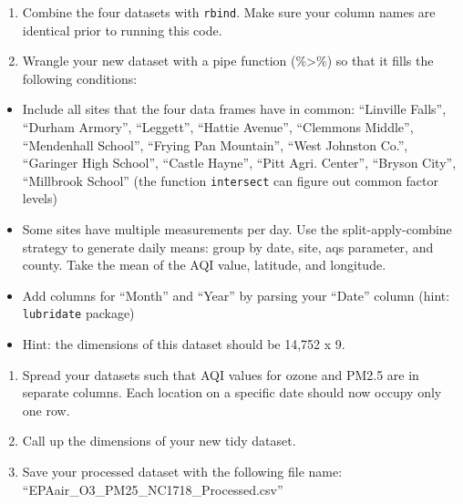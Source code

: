 \documentclass[
]{article}
\providecommand{\tightlist}{%
  \setlength{\itemsep}{0pt}\setlength{\parskip}{0pt}}
\begin{document}
\begin{enumerate}
\def\labelenumi{\arabic{enumi}.}
\setcounter{enumi}{6}
\tightlist
\item
  Combine the four datasets with \texttt{rbind}. Make sure your column
  names are identical prior to running this code.
\item
  Wrangle your new dataset with a pipe function (\%\textgreater\%) so
  that it fills the following conditions:
\end{enumerate}

\begin{itemize}
\tightlist
\item
  Include all sites that the four data frames have in common: ``Linville
  Falls'', ``Durham Armory'', ``Leggett'', ``Hattie Avenue'', ``Clemmons
  Middle'', ``Mendenhall School'', ``Frying Pan Mountain'', ``West
  Johnston Co.'', ``Garinger High School'', ``Castle Hayne'', ``Pitt
  Agri. Center'', ``Bryson City'', ``Millbrook School'' (the function
  \texttt{intersect} can figure out common factor levels)
\item
  Some sites have multiple measurements per day. Use the
  split-apply-combine strategy to generate daily means: group by date,
  site, aqs parameter, and county. Take the mean of the AQI value,
  latitude, and longitude.
\item
  Add columns for ``Month'' and ``Year'' by parsing your ``Date'' column
  (hint: \texttt{lubridate} package)
\item
  Hint: the dimensions of this dataset should be 14,752 x 9.
\end{itemize}

\begin{enumerate}
\def\labelenumi{\arabic{enumi}.}
\setcounter{enumi}{8}
\tightlist
\item
  Spread your datasets such that AQI values for ozone and PM2.5 are in
  separate columns. Each location on a specific date should now occupy
  only one row.
\item
  Call up the dimensions of your new tidy dataset.
\item
  Save your processed dataset with the following file name:
  ``EPAair\_O3\_PM25\_NC1718\_Processed.csv''
\end{enumerate}
\end{document}
